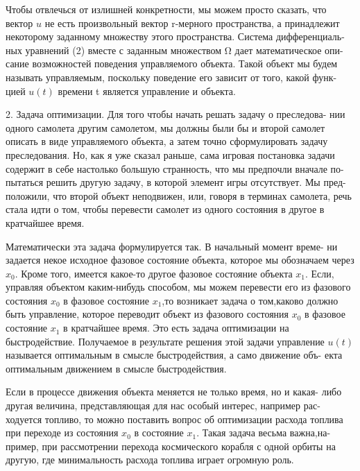 \documentclass[10pt]{article}
\begin{document}
Чтобы отвлечься от излишней конкретности, мы можем просто сказать, что вектор \(u\) не есть произвольный вектор r-мерного пространства, а принадлежит некоторому заданному множеству этого пространства. Система дифференциаль- ных уравнений (2) вместе с заданным множеством Ω дает математическое опи- сание возможностей поведения управляемого объекта. Такой объект мы будем называть управляемым, поскольку поведение его зависит от того, какой функ- цией \(u\left( t\right)\) времени t является управление и объекта.

2. Задача оптимизации. Для того чтобы начать решать задачу о преследова- нии одного самолета другим самолетом, мы должны были бы и второй самолет описать в виде управляемого объекта, а затем точно сформулировать задачу преследования. Но, как я уже сказал раньше, сама игровая постановка задачи содержит в себе настолько большую странность, что мы предпочли вначале по- пытаться решить другую задачу, в которой элемент игры отсутствует. Мы пред- положили, что второй объект неподвижен, или, говоря в терминах самолета, речь стала идти о том, чтобы перевести самолет из одного состояния в другое в кратчайшее время.

Математически эта задача формулируется так. В начальный момент време- ни задается некое исходное фазовое состояние объекта, которое мы обозначаем через \({x}_{0}\). Кроме того, имеется какое-то другое фазовое состояние объекта \({x}_{1}\). Если, управляя объектом каким-нибудь способом, мы можем перевести его из фазового состояния \({x}_{0}\) в фазовое состояние \({x}_{1}\),то возникает задача о том,каково должно быть управление, которое переводит объект из фазового состояния \({x}_{0}\) в фазовое состояние \({x}_{1}\) в кратчайшее время. Это есть задача оптимизации на быстродействие. Получаемое в результате решения этой задачи управление \(u\left( t\right)\) называется оптимальным в смысле быстродействия, а само движение объ- екта оптимальным движением в смысле быстродействия.

Если в процессе движения объекта меняется не только время, но и какая- либо другая величина, представляющая для нас особый интерес, например рас- ходуется топливо, то можно поставить вопрос об оптимизации расхода топлива при переходе из состояния \({x}_{0}\) в состояние \({x}_{1}\). Такая задача весьма важна,на- пример, при рассмотрении перехода космического корабля с одной орбиты на другую, где минимальность расхода топлива играет огромную роль.
\end{document}
